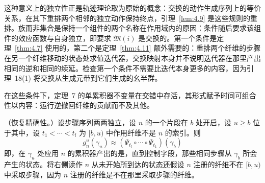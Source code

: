 这种意义上的独立性正是轨迹理论取为原始的概念：交换的动作生成序列上的等价关系，在其下重排两个相邻的独立动作保持终点\cite{ref44}，引理~\ref{lem:4.9} 是这些规则的重排。族而非集合是保持一个组件的两个名称在作用域内的原因：条件随后要求该组件的效应函数与自身独立，即要求 $\mathfrak{M}(i)$ 是交换的。第一个条件是定理~\ref{thm:4.7} 使用的，第二个是定理~\ref{thm:4.11} 额外需要的：重排两个纤维的步骤在另一个纤维移动的状态处求值迭代器，交换映射本身并不说明迭代器在那里产出相同的逆和相同的续延。检查第一个条件不需要比迭代本身更多的内容，因为引理~18(1) 将交换从生成元带到它们生成的幺半群。

在这些条件下，定理~7 的单累积器不变量在交错中存活，其形式赋予时间可组合性以内容：运行逆撤回纤维的贡献而不及其他。

\begin{theorem}\label{thm:4.7}
（恢复精确性。）设步骤序列两两独立，设 $n$ 的一个片段在 $b$ 处开启，设 $u \geqslant b$ 位于其中，设 $t_1 < \cdots < t_l$ 为 $[b, u)$ 中作用纤维不是 $n$ 的索引。则
\begin{equation}\label{eq:4.25}
g^u_n(\gamma_u) \approx (\Psi_{t_l} \circ \cdots \circ \Psi_{t_1})(\gamma_b)
\end{equation}
即，在 $\gamma_u$ 处应用 $n$ 的累积器产出的是，直到控制字段，那些相同步骤从 $\gamma_b$ 所会产生的状态。将右侧读作 $n$ 从未开始所到达的状态还假设 $n$ 注册的纤维不在 $[b, u)$ 中采取步骤，因为 $n$ 注册的纤维是不在那里采取步骤的纤维。
\end{theorem}

